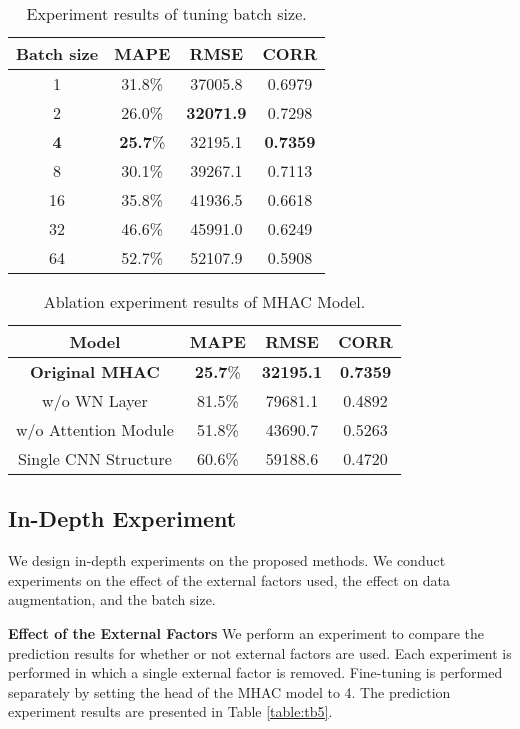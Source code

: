 \documentclass[conference]{IEEEtran}
\begin{document}
\begin{table}[t]
\centering
\caption{Experiment results of tuning batch size.}
\begin{tabular}[t]{c|c|c|c}
\hline
Batch size&MAPE&RMSE&CORR\\
\hline
1&31.8\%&37005.8&0.6979\\

2&26.0\%&\textbf{32071.9}&0.7298\\

\textbf{4}&\textbf{25.7}\%&32195.1&\textbf{0.7359}\\

8&30.1\%&39267.1&0.7113\\

16&35.8\%&41936.5&0.6618\\

32&46.6\%&45991.0&0.6249\\

64&52.7\%&52107.9&0.5908\\

\end{tabular}
\label{table:tb7}
\end{table}


\begin{table}[t]
\centering
\caption{Ablation experiment results of MHAC Model.}
\begin{tabular}[t]{c|c|c|c}
\hline
Model&MAPE&RMSE&CORR\\
\hline
\textbf{Original MHAC}&\textbf{25.7}\%&\textbf{32195.1}&\textbf{0.7359}\\

w/o WN Layer&81.5\%&79681.1&0.4892\\

w/o Attention Module&51.8\%&43690.7&0.5263\\

Single CNN Structure&60.6\%&59188.6&0.4720\\

\end{tabular}
\label{table:tb4}
\end{table}

\subsection{In-Depth Experiment}
We design in-depth experiments on the proposed methods. We conduct experiments on the effect of the external factors used, the effect on data augmentation, and the batch size.

\noindent \textbf{Effect of the External Factors} We perform an experiment to compare the prediction results for whether or not external factors are used. Each experiment is performed in which a single external factor is removed. Fine-tuning is performed separately by setting the head of the MHAC model to 4. The prediction experiment results are presented in Table \ref{table:tb5}.
\end{document}
